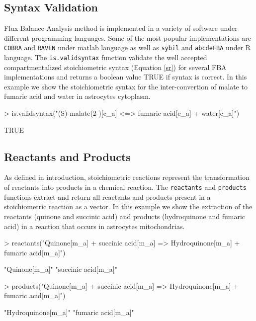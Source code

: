 \subsection*{Syntax Validation}
Flux Balance Analysis method is implemented in a variety of software under different programming languages. Some of the most popular implementations are \texttt{COBRA} \cite{Becker2007} and \texttt{RAVEN} \cite{Agren2013} under matlab language as well as \texttt{sybil} and \texttt{abcdeFBA} under R language. The \texttt{is.validsyntax} function validate the well accepted compartmentalized stoichiometric syntax (Equation \ref{sr}) for several FBA implementations and returns a boolean value TRUE if syntax is correct. In this example we show the stoichiometric syntax for the inter-convertion of  malate to fumaric acid and water in astrocytes cytoplasm.
\begin{Schunk}
\begin{Sinput}
> is.validsyntax("(S)-malate(2-)[c_a] <=> fumaric acid[c_a] + water[c_a]")
\end{Sinput}
\begin{Soutput}
[1] TRUE
\end{Soutput}
\end{Schunk}
\subsection*{Reactants and Products}
As defined in introduction, stoichiometric reactions represent the transformation of reactants into products in a chemical reaction. The \texttt{reactants} and \texttt{products} functions extract and return all reactants and products present in a stoichiometric reaction  as a vector. In this example we show the extraction of the reactants (quinone and succinic acid) and products (hydroquinone and fumaric acid) in a reaction that occurs in astrocytes mitochondrias.
\begin{Schunk}
\begin{Sinput}
> reactants("Quinone[m_a] + succinic acid[m_a] => Hydroquinone[m_a] + fumaric acid[m_a]")
\end{Sinput}
\begin{Soutput}
[1] "Quinone[m_a]"       "succinic acid[m_a]"
\end{Soutput}
\begin{Sinput}
> products("Quinone[m_a] + succinic acid[m_a] => Hydroquinone[m_a] + fumaric acid[m_a]")
\end{Sinput}
\begin{Soutput}
[1] "Hydroquinone[m_a]" "fumaric acid[m_a]"
\end{Soutput}
\end{Schunk}
